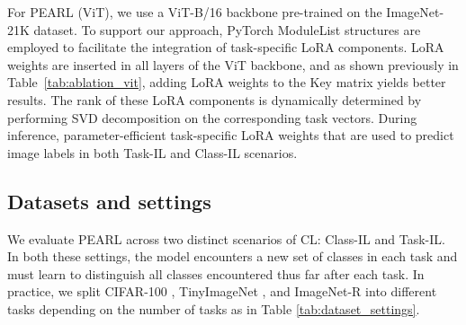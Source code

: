 \documentclass[10pt]{article} %
\begin{document}
For PEARL (ViT), we use a ViT-B/16 backbone pre-trained on the ImageNet-21K dataset. To support our approach, PyTorch ModuleList structures are employed to facilitate the integration of task-specific LoRA components. LoRA weights are inserted in all layers of the ViT backbone, and as shown previously in Table~\ref{tab:ablation_vit}, adding LoRA weights to the Key matrix yields better results. The rank of these LoRA components is dynamically determined by performing SVD decomposition on the corresponding task vectors. During inference, parameter-efficient task-specific LoRA weights that are used to predict image labels in both Task-IL and Class-IL scenarios.


\subsection{Datasets and settings}\label{appendix:dataset_settings}
We evaluate PEARL across two distinct scenarios of CL: Class-IL and Task-IL. In both these settings,  the model encounters a new set of classes in each task and must learn to distinguish all classes encountered thus far after each task. In practice, we split  CIFAR-100 \citep{krizhevsky2009learning}, TinyImageNet \citep{le2015tiny}, and ImageNet-R \citep{hendrycks2021many} into different tasks depending on the number of tasks as in Table \ref{tab:dataset_settings}.









\end{document}
